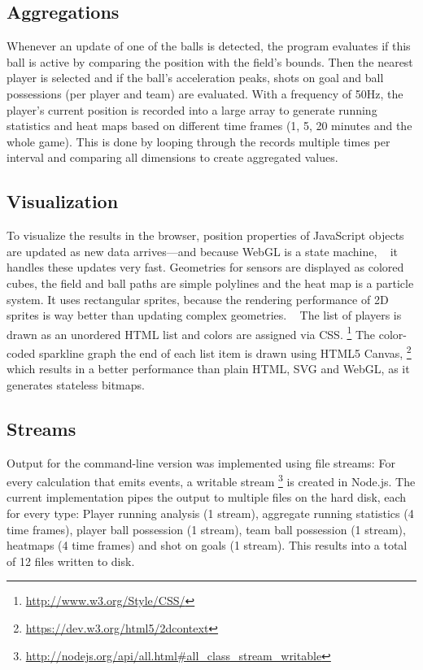 \documentclass{sig-alternate}
\newcommand{\inlinelistingsize}{\fontsize{8pt}{11pt}}
\let\oldurl\url
\renewcommand{\url}[1]{\inlinelistingsize\oldurl{#1}}
\begin{document}
\subsection{Aggregations}

Whenever an update of one of the balls is detected,
the program evaluates if this ball is active
by comparing the position with the field’s bounds.
Then the nearest player is selected
and if the ball’s acceleration peaks,
shots on goal and ball possessions
(per player and team) are evaluated.
With a frequency of 50Hz, the player’s current position
is recorded into a large array to generate running statistics
and heat maps based on different time frames
(1, 5, 20 minutes and the whole game).
This is done by looping through the records
multiple times per interval
and comparing all dimensions to create aggregated values.

\subsection{Visualization}

To visualize the results in the browser,
position properties of JavaScript objects are updated
as new data arrives---and because WebGL is a state machine,%
~\cite{cantor2012webgl}
it handles these updates very fast.
Geometries for sensors are displayed as colored cubes,
the field and ball paths are simple polylines
and the heat map is a particle system.
It uses rectangular sprites, because the rendering performance
of 2D sprites is way better than updating complex geometries.%
~\cite{hoetzlein2012graphics}
The list of players is drawn as an unordered HTML list
and colors are assigned via CSS.%
\footnote{\url{http://www.w3.org/Style/CSS/}}
The color-coded sparkline graph the end of each list item
is drawn using HTML5 Canvas,%
\footnote{\url{https://dev.w3.org/html5/2dcontext}}
which results in a better performance than plain HTML,
SVG and WebGL, as it generates stateless bitmaps.

\subsection{Streams}

Output for the command-line version was implemented
using file streams: For every calculation that emits events,
a writable stream%
\footnote{\url{http://nodejs.org/api/all.html#all_class_stream_writable}}
is created in Node.js.
The current implementation pipes the output to multiple files
on the hard disk, each for every type:
Player running analysis (1 stream),
aggregate running statistics (4 time frames),
player ball possession (1 stream),
team ball possession (1 stream),
heatmaps (4 time frames) and shot on goals (1 stream).
This results into a total of 12 files written to disk.
\end{document}

